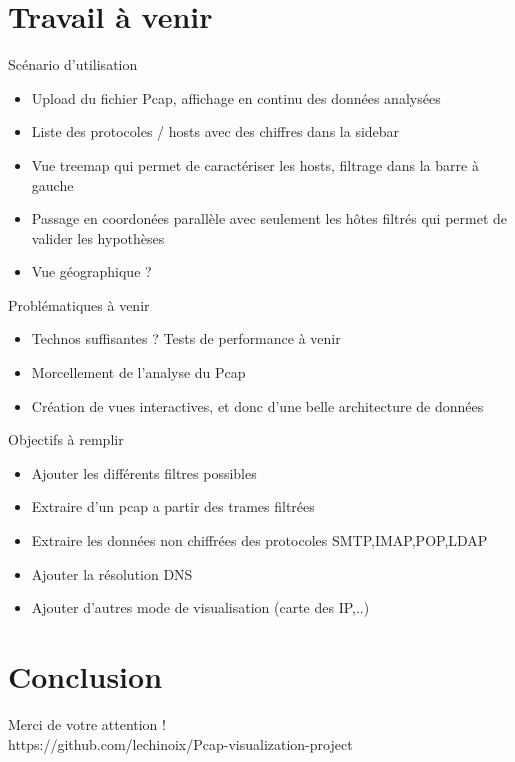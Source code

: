 \documentclass{beamer}
\begin{document}
  \section{Travail à venir}
  \begin{frame}
    Scénario d'utilisation
    \begin{itemize}
     \item Upload du fichier Pcap, affichage en continu des données analysées
     \item Liste des protocoles / hosts avec des chiffres dans la sidebar
     \item Vue treemap qui permet de caractériser les hosts, filtrage dans la
     barre à gauche
     \item Passage en coordonées parallèle avec seulement les hôtes filtrés qui
     permet de valider les hypothèses
     \item Vue géographique ?
    \end{itemize}
  \end{frame}
  
  \begin{frame}
    Problématiques à venir
    \begin{itemize}
     \item Technos suffisantes ? Tests de performance à venir
     \item Morcellement de l'analyse du Pcap
     \item Création de vues interactives, et donc d'une belle architecture de
     données
     \end{itemize}
  \end{frame}
  
  \begin{frame}
    Objectifs à remplir
    \begin{itemize}
     \item Ajouter les différents filtres possibles
     \item Extraire d'un pcap a partir des trames filtrées
     \item Extraire les données non chiffrées des protocoles SMTP,IMAP,POP,LDAP
     \item Ajouter la résolution DNS
     \item Ajouter d'autres mode de visualisation (carte des IP,..)
    \end{itemize}
  \end{frame}


  \section{Conclusion}
  \begin{frame}
    \begin{center}
      Merci de votre attention ! \\
      https://github.com/lechinoix/Pcap-visualization-project
    \end{center}
  \end{frame}
\end{document}
